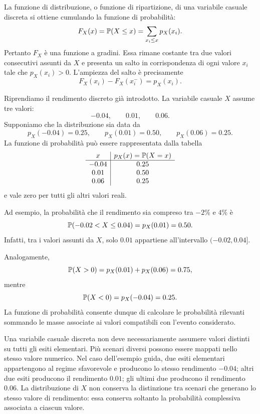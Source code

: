 La funzione di distribuzione, o funzione di ripartizione, di una variabile casuale discreta si ottiene
cumulando la funzione di probabilit\`{a}:
\[
F_X(x)
=
\mathbb{P}(X\leq x)
=
\sum_{x_i\leq x}p_X(x_i).
\]
Pertanto $F_X$ \`{e} una funzione a gradini. Essa rimane costante tra due valori
consecutivi assunti da $X$ e presenta un salto in corrispondenza di ogni valore
$x_i$ tale che $p_X(x_i)>0$. L'ampiezza del salto \`{e} precisamente
\[
F_X(x_i)-F_X(x_i^-)=p_X(x_i).
\]

\begin{example}
Riprendiamo il rendimento discreto gi\`{a} introdotto. La variabile casuale $X$
assume tre valori:
\[
-0.04,
\qquad
0.01,
\qquad
0.06.
\]
Supponiamo che la distribuzione sia data da
\[
p_X(-0.04)=0.25,
\qquad
p_X(0.01)=0.50,
\qquad
p_X(0.06)=0.25.
\]
La funzione di probabilit\`{a} pu\`{o} essere rappresentata dalla tabella
\[
\begin{array}{c|c}
x & p_X(x)=\mathbb{P}(X=x)\\
\hline
-0.04 & 0.25\\
 0.01 & 0.50\\
 0.06 & 0.25
\end{array}
\]
e vale zero per tutti gli altri valori reali.

Ad esempio, la probabilit\`{a} che il rendimento sia compreso tra $-2\%$ e
$4\%$ \`{e}
\[
\mathbb{P}(-0.02<X\leq 0.04)
=
p_X(0.01)
=
0.50.
\]
Infatti, tra i valori assunti da $X$, solo $0.01$ appartiene all'intervallo
$(-0.02,0.04]$.

Analogamente,
\[
\mathbb{P}(X>0)
=
p_X(0.01)+p_X(0.06)
=
0.75,
\]
mentre
\[
\mathbb{P}(X<0)
=
p_X(-0.04)
=
0.25.
\]
La funzione di probabilit\`{a} consente dunque di calcolare le probabilit\`{a} rilevanti
sommando le masse associate ai valori compatibili con l'evento considerato.
\end{example}

Una variabile casuale discreta non deve necessariamente assumere valori distinti
su tutti gli esiti elementari. Pi\`{u} scenari diversi possono essere mappati nello
stesso valore numerico. Nel caso dell'esempio guida, due esiti elementari
appartengono al regime sfavorevole e producono lo stesso rendimento $-0.04$;
altri due esiti producono il rendimento $0.01$; gli ultimi due producono il
rendimento $0.06$. La distribuzione di $X$ non conserva la distinzione tra
scenari che generano lo stesso valore di rendimento: essa conserva soltanto la
probabilit\`{a} complessiva associata a ciascun valore.

